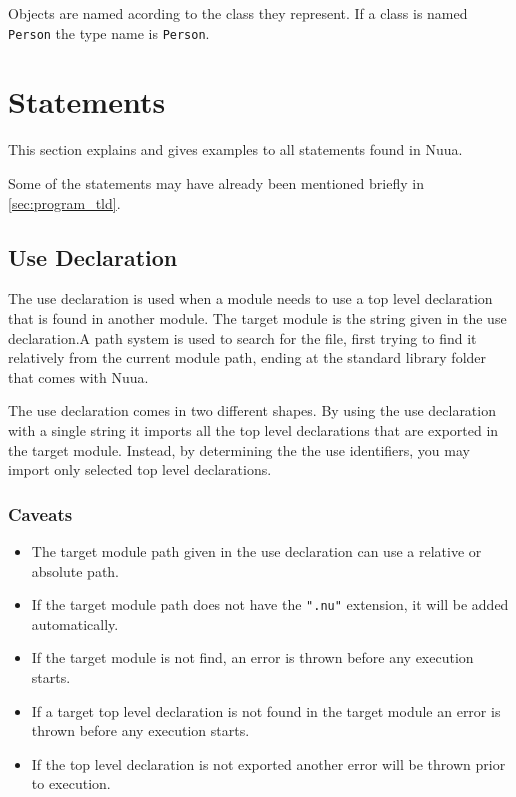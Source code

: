Objects are named acording to the class they represent. If a class is named \texttt{Person} the type name is \texttt{Person}.

\section{Statements}

This section explains and gives examples to all statements found in Nuua.

Some of the statements may have already been mentioned briefly in \autoref{sec:program_tld}.

\subsection{Use Declaration}

The use declaration is used when a module needs to use a top level declaration
that is found in another module. The target module is the string given in the use declaration.A path system is used to search for the file,
first trying to find it relatively from the current module path, ending at the standard library folder that comes with Nuua.

The use declaration comes in two different shapes. By using the use declaration with a single string it imports all the top level
declarations that are exported in the target module. Instead, by determining the the use identifiers, you may import only selected top level
declarations.

\subsubsection{Caveats}

\begin{itemize}
    \item The target module path given in the use declaration can use a relative or absolute path.
    \item If the target module path does not have the \texttt{".nu"} extension, it will be added automatically.
    \item If the target module is not find, an error is thrown before any execution starts.
    \item If a target top level declaration is not found in the target module an error is thrown before any execution starts.
    \item If the top level declaration is not exported another error will be thrown prior to execution.
\end{itemize}


